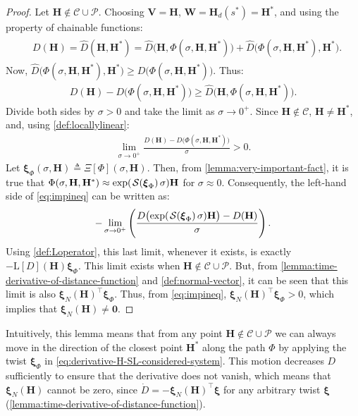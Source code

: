 \begin{proof}
    Let $\mathbf{H} \notin \mathcal{C} \cup \mathcal{P}$. Choosing $\mathbf{V} = \mathbf{H}$, $\mathbf{W} = \mathbf{H}_d(s^*) = \mathbf{H}^*$, and using the property of chainable functions:
    \begin{align}        
        \begin{split}
            & D(\mathbf{H}) = \widehat{D}(\mathbf{H},\mathbf{H}^*) = \widehat{D}\bigl(\mathbf{H},\Phi(\sigma,\mathbf{H},\mathbf{H}^*)\bigr){+} \widehat{D}\bigl(\Phi(\sigma,\mathbf{H},\mathbf{H}^*),\mathbf{H}^*\bigr).        
        \end{split}
    \end{align}
Now, $\widehat{D}\bigl(\Phi(\sigma,\mathbf{H},\mathbf{H}^*),\mathbf{H}^*\bigr) \geq D\bigl(\Phi(\sigma,\mathbf{H},\mathbf{H}^*)\bigr)$. Thus:
\begin{align}
    D(\mathbf{H})-D\bigl(\Phi(\sigma,\mathbf{H},\mathbf{H}^*)\bigr) \geq \widehat{D}\bigl(\mathbf{H},\Phi(\sigma,\mathbf{H},\mathbf{H}^*)\bigr).
\end{align}
Divide both sides by $\sigma >0$ and take the limit as $\sigma \rightarrow 0^+$. Since $\mathbf{H} \not \in \mathcal{C}$, $\mathbf{H} \not = \mathbf{H}^*$, and, using \cref{def:locallylinear}:
\begin{align}
\label{eq:impineq}
 \lim_{\sigma \rightarrow 0^+} \frac{D(\mathbf{H})-D\bigl(\Phi(\sigma,\mathbf{H},\mathbf{H}^*)\bigr)}{\sigma} > 0.   
\end{align}
Let $\boldsymbol{\xi}_\Phi(\sigma,\mathbf{H}) \triangleq \Xi[\Phi](\sigma,\mathbf{H})$. Then, from \cref{lemma:very-important-fact}, it is true that $\Phi(\sigma,\mathbf{H},\mathbf{H}^*) \approx \exp(\SL[\boldsymbol{\xi}_\Phi]\sigma)\mathbf{H}$ for $\sigma \approx 0$. Consequently, the left-hand side of \eqref{eq:impineq} can be written as:
\begin{equation}
\label{eq:impineq2}
  -\lim_{\sigma \rightarrow 0^+} \left( \frac{D\bigl(\exp(\SL[\boldsymbol{\xi}_\Phi]\sigma)\mathbf{H}\bigr) - D(\mathbf{H})}{\sigma} \right).
\end{equation}
Using \cref{def:Loperator}, this last limit, whenever it exists, is exactly $-\text{L}[D](\mathbf{H}) \boldsymbol{\xi}_\Phi$. This limit exists when $\mathbf{H} \not \in \mathcal{C} \cup \mathcal{P}$. But, from \cref{lemma:time-derivative-of-distance-function} and \cref{def:normal-vector}, it can be seen that this limit is also $\boldsymbol{\xi}_N(\mathbf{H})^\top \boldsymbol{\xi}_\Phi$. Thus, from  \eqref{eq:impineq}, $\boldsymbol{\xi}_N(\mathbf{H})^\top \boldsymbol{\xi}_\Phi > 0$,  which implies that $\boldsymbol{\xi}_N(\mathbf{H}) \not= \mathbf{0}$. 
\end{proof}
Intuitively, this lemma means that from any point $\mathbf{H} \notin \mathcal{C} \cup \mathcal{P}$ we can always move in the direction of the closest point $\mathbf{H}^*$ along the path $\Phi$ by applying the twist $\boldsymbol{\xi}_\Phi$ in \eqref{eq:derivative-H-SL-considered-system}. This motion decreases $D$ sufficiently to ensure that the derivative does not vanish, which means that $\boldsymbol{\xi}_N(\mathbf{H})$ cannot be zero, since $\dot{D} = -\boldsymbol{\xi}_N(\mathbf{H})^{\top} \boldsymbol{\xi}$ for any arbitrary twist $\boldsymbol{\xi}$ (\cref{lemma:time-derivative-of-distance-function}).
